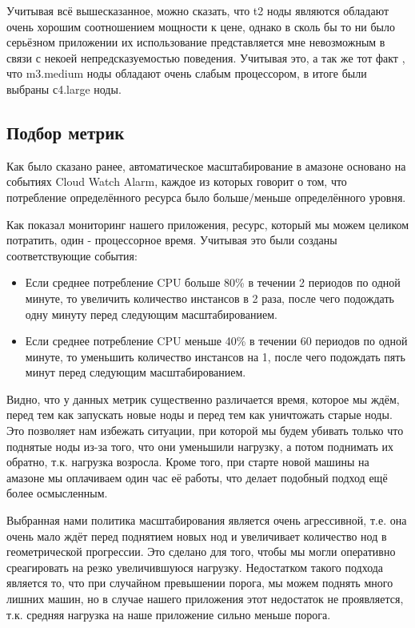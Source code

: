 	Учитывая всё вышесказанное, можно сказать, что t2 ноды являются обладают очень хорошим соотношением мощности к цене, однако в сколь бы то ни было серьёзном приложении их использование представляется мне невозможным в связи с некоей непредсказуемостью поведения. Учитывая это, а так же тот факт , что m3.medium ноды обладают очень слабым процессором, в итоге были выбраны с4.large ноды.
\subsection{Подбор метрик}
	Как было сказано ранее, автоматическое масштабирование в амазоне основано на событиях Cloud Watch Alarm, каждое из которых говорит о том, что потребление определённого ресурса было больше/меньше определённого уровня.
	
	Как показал мониторинг нашего приложения, ресурс, который мы можем целиком потратить, один - процессорное время. Учитывая это были созданы соответствующие события:
\begin{itemize}
	\item Если среднее потребление CPU больше 80\% в течении 2 периодов по одной минуте, то увеличить количество инстансов в 2 раза, после чего подождать одну минуту перед следующим масштабированием.
	\item Если среднее потребление CPU меньше 40\% в течении 60 периодов по одной минуте, то уменьшить количество инстансов на 1, после чего подождать пять минут перед следующим масштабированием.
\end{itemize}
	Видно, что у данных метрик существенно различается время, которое мы ждём, перед тем как запускать новые ноды и перед тем как уничтожать старые ноды. Это позволяет нам избежать ситуации, при которой мы будем убивать только что поднятые ноды из-за того, что они уменьшили нагрузку, а потом поднимать их обратно, т.к. нагрузка возросла. Кроме того, при старте новой машины на амазоне мы оплачиваем один час её работы, что делает подобный подход ещё более осмысленным.
	
	Выбранная нами политика масштабирования является очень агрессивной, т.е. она очень мало ждёт перед поднятием новых нод и увеличивает количество нод в геометрической прогрессии. Это сделано для того, чтобы мы могли оперативно среагировать на резко увеличившуюся нагрузку. Недостатком такого подхода является то, что при случайном превышении порога, мы можем поднять много лишних машин, но в случае нашего приложения этот недостаток не проявляется, т.к. средняя нагрузка на наше приложение сильно меньше порога.
	
